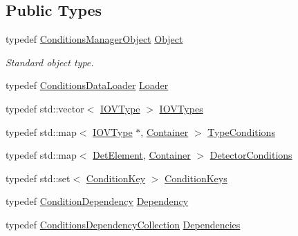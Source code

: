 \subsection*{Public Types}
\begin{DoxyCompactItemize}
\item 
typedef \hyperlink{class_d_d4hep_1_1_conditions_1_1_conditions_manager_object}{ConditionsManagerObject} \hyperlink{class_d_d4hep_1_1_conditions_1_1_conditions_manager_ae865f49d144d8ba5be9eec3e1d8fec94}{Object}
\begin{DoxyCompactList}\small\item\em Standard object type. \item\end{DoxyCompactList}\item 
typedef \hyperlink{class_d_d4hep_1_1_conditions_1_1_conditions_data_loader}{ConditionsDataLoader} \hyperlink{class_d_d4hep_1_1_conditions_1_1_conditions_manager_acd0f1e242240cc1c07a0d029a716a718}{Loader}
\item 
typedef std::vector$<$ \hyperlink{class_d_d4hep_1_1_i_o_v_type}{IOVType} $>$ \hyperlink{class_d_d4hep_1_1_conditions_1_1_conditions_manager_aad65a81edf6d4cf81f33f660537587f8}{IOVTypes}
\item 
typedef std::map$<$ \hyperlink{class_d_d4hep_1_1_i_o_v_type}{IOVType} $\ast$, \hyperlink{class_d_d4hep_1_1_conditions_1_1_container}{Container} $>$ \hyperlink{class_d_d4hep_1_1_conditions_1_1_conditions_manager_a8a7e3616b547ab4aadf035d8ef70f844}{TypeConditions}
\item 
typedef std::map$<$ \hyperlink{namespace_d_d4hep_a21dd977310ff183f61ca6ae14b59a989}{DetElement}, \hyperlink{class_d_d4hep_1_1_conditions_1_1_container}{Container} $>$ \hyperlink{class_d_d4hep_1_1_conditions_1_1_conditions_manager_a27022fcc820a7fd132d3f74ed4ed6c1f}{DetectorConditions}
\item 
typedef std::set$<$ \hyperlink{class_d_d4hep_1_1_conditions_1_1_condition_key}{ConditionKey} $>$ \hyperlink{class_d_d4hep_1_1_conditions_1_1_conditions_manager_a8dd76f9acef2c8d3b7970e266fe7eff6}{ConditionKeys}
\item 
typedef \hyperlink{class_d_d4hep_1_1_conditions_1_1_condition_dependency}{ConditionDependency} \hyperlink{class_d_d4hep_1_1_conditions_1_1_conditions_manager_a8787c205ff23a5883d7bf98f9b06b408}{Dependency}
\item 
typedef \hyperlink{class_d_d4hep_1_1_conditions_1_1_conditions_dependency_collection}{ConditionsDependencyCollection} \hyperlink{class_d_d4hep_1_1_conditions_1_1_conditions_manager_aab778cfbe096ae8ad20a0bdbb047ad32}{Dependencies}
\end{DoxyCompactItemize}
